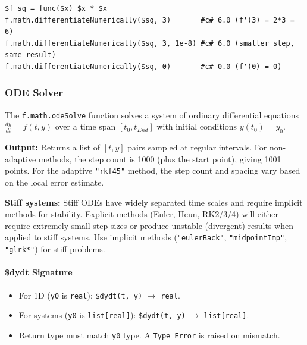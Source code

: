 \begin{verbatim}
$f sq = func($x) $x * $x
f.math.differentiateNumerically($sq, 3)       #c# 6.0 (f'(3) = 2*3 = 6)
f.math.differentiateNumerically($sq, 3, 1e-8) #c# 6.0 (smaller step, same result)
f.math.differentiateNumerically($sq, 0)       #c# 0.0 (f'(0) = 0)
\end{verbatim}

\subsubsection{ODE Solver}
The \texttt{f.math.odeSolve} function solves a system of ordinary differential equations $\frac{dy}{dt} = f(t, y)$ over a time span $[t_0, t_{End}]$ with initial conditions $y(t_0) = y_0$.

\textbf{Output:} Returns a list of $[t, y]$ pairs sampled at regular intervals. For non-adaptive methods, the step count is 1000 (plus the start point), giving 1001 points. For the adaptive \texttt{"rkf45"} method, the step count and spacing vary based on the local error estimate.

\textbf{Stiff systems:} Stiff ODEs have widely separated time scales and require implicit methods for stability. Explicit methods (Euler, Heun, RK2/3/4) will either require extremely small step sizes or produce unstable (divergent) results when applied to stiff systems. Use implicit methods (\texttt{"eulerBack"}, \texttt{"midpointImp"}, \texttt{"glrk*"}) for stiff problems.

\paragraph{\$dydt Signature}
\begin{itemize}
\item For 1D (\texttt{y0} is \texttt{real}): \texttt{\$dydt(t, y)} $\rightarrow$ \texttt{real}.
\item For systems (\texttt{y0} is \texttt{list[real]}): \texttt{\$dydt(t, y)} $\rightarrow$ \texttt{list[real]}.
\item Return type must match \texttt{y0} type. A \texttt{Type Error} is raised on mismatch.
\end{itemize}

